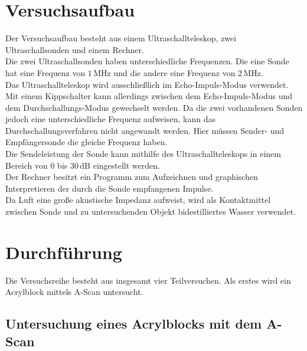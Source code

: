 \section{Versuchsaufbau}
\label{sec:Versuchsaufbau}

Der Versuchsaufbau besteht aus einem Ultraschallteleskop,
zwei Ultraschallsonden und einem Rechner.\\
Die zwei Ultraschallsonden haben unterschiedliche Frequenzen.
Die eine Sonde hat eine Frequenz von $1 \, \si{\mega\hertz}$ und die andere
eine Frequenz von $2 \, \si{\mega\hertz}$.\\
Das Ultraschallteleskop wird ausschließlich im Echo-Impuls-Modus
verwendet. Mit einem Kippschalter kann allerdings zwischen dem
Echo-Impuls-Modus und dem Durchschallungs-Modus gewechselt werden. 
Da die zwei vorhandenen Sonden jedoch eine unterschiedliche Frequenz 
aufweisen, kann das Durchschallungsverfahren nicht angewandt werden.
Hier müssen Sender- und Empfängersonde die gleiche Frequenz haben.\\
Die Sendeleistung der Sonde kann mithilfe des Ultraschallteleskops 
in einem Bereich von $0$ bis $30 \, \si{\dB}$ eingestellt werden.\\
Der Rechner besitzt ein Programm zum Aufzeichnen und graphischen Interpretieren
der durch die Sonde empfangenen Impulse.\\
Da Luft eine große akustische Impedanz aufweist, wird als Kontaktmittel
zwischen Sonde und zu untersuchenden Objekt bidestilliertes Wasser
verwendet.\\


\section{Durchführung}
\label{sec:Durchführung}

Die Versuchsreihe besteht aus insgesamt vier Teilversuchen. Als erstes wird
ein Acrylblock mittels A-Scan untersucht.\\

\subsection{Untersuchung eines Acrylblocks mit dem A-Scan}

